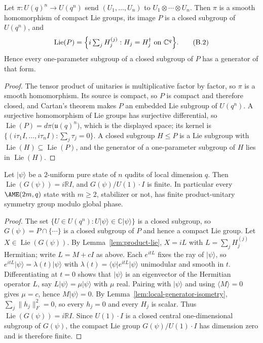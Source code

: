 \begin{lemma}\label{lem:product-lie}
Let \(\pi:U(q)^n\to U(q^n)\) send \((U_1,\ldots,U_n)\) to
\(U_1\otimes\cdots\otimes U_n\).  Then \(\pi\) is a smooth homomorphism of
compact Lie groups, its image \(P\) is a closed subgroup of \(U(q^n)\), and
\[
 \operatorname{Lie}(P)
  =\Bigl\{i\textstyle\sum_{j}H_j^{(j)}:
    H_j=H_j^\dagger\ \text{on }\mathbb C^q\Bigr\}.       \tag{B.2}
\]
Hence every one-parameter subgroup of a closed subgroup of \(P\) has a
generator of that form.
\end{lemma}

\begin{proof}
The tensor product of unitaries is multiplicative factor by factor, so
\(\pi\) is a smooth homomorphism.  Its source is compact, so \(P\) is
compact and therefore closed, and Cartan's theorem makes \(P\) an embedded
Lie subgroup of \(U(q^n)\).  A surjective homomorphism of Lie groups has
surjective differential, so
\(\operatorname{Lie}(P)=d\pi\bigl(\mathfrak u(q)^n\bigr)\), which is the
displayed space; its kernel is
\(\{(i\tau_1I,\ldots,i\tau_nI):\sum_j\tau_j=0\}\).  A closed subgroup
\(H\leq P\) is a Lie subgroup with
\(\operatorname{Lie}(H)\subseteq\operatorname{Lie}(P)\), and the generator
of a one-parameter subgroup of \(H\) lies in \(\operatorname{Lie}(H)\).
\end{proof}

\begin{theorem}
\label{thm:two-uniform-discrete}
Let \(\lvert\psi\rangle\) be a \(2\)-uniform pure state of \(n\) qudits of
local dimension \(q\).  Then \(\operatorname{Lie}(G(\psi))=i\mathbb RI\),
and \(G(\psi)/U(1)\cdot I\) is finite.  In particular every
\(\AME(2m,q)\) state with \(m\geq2\), stabilizer or not, has finite
product-unitary symmetry group modulo global phase.
\end{theorem}

\begin{proof}
The set \(\{U\in U(q^n):U\lvert\psi\rangle\in\mathbb C\lvert\psi\rangle\}\)
is a closed subgroup, so \(G(\psi)=P\cap\{\cdots\}\) is a closed subgroup
of \(P\) and hence a compact Lie group.  Let
\(X\in\operatorname{Lie}(G(\psi))\).  By Lemma~\ref{lem:product-lie},
\(X=iL\) with \(L=\sum_jH_j^{(j)}\) Hermitian; write \(L=M+cI\) as above.
Each \(e^{itL}\) fixes the ray of \(\lvert\psi\rangle\), so
\(e^{itL}\lvert\psi\rangle=\lambda(t)\lvert\psi\rangle\) with
\(\lambda(t)=\langle\psi\rvert e^{itL}\lvert\psi\rangle\) unimodular and
smooth in \(t\).  Differentiating at \(t=0\) shows that
\(\lvert\psi\rangle\) is an eigenvector of the Hermitian operator \(L\),
say \(L\lvert\psi\rangle=\mu\lvert\psi\rangle\) with \(\mu\) real.  Pairing
with \(\lvert\psi\rangle\) and using \(\langle M\rangle=0\) gives
\(\mu=c\), hence \(M\lvert\psi\rangle=0\).  By
Lemma~\ref{lem:local-generator-isometry}, \(\sum_j\lVert h_j\rVert_F^2=0\),
so every \(h_j=0\) and every \(H_j\) is scalar.  Thus
\(\operatorname{Lie}(G(\psi))=i\mathbb RI\).  Since \(U(1)\cdot I\) is a
closed central one-dimensional subgroup of \(G(\psi)\), the compact Lie
group \(G(\psi)/U(1)\cdot I\) has dimension zero and is therefore finite.
\end{proof}

